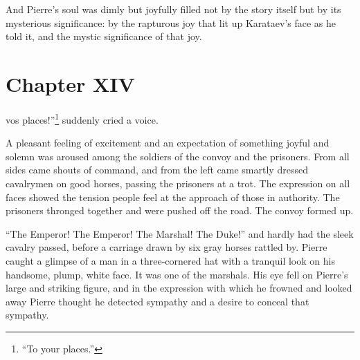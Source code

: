 And Pierre's soul was dimly but joyfully filled not by the story
itself but by its mysterious significance: by the rapturous joy
that lit up Karataev's face as he told it, and the mystic
significance of that joy.


\chapter*{Chapter XIV} \ifaudio {}
\fi

 vos places!''\footnote{``To your places.''} suddenly cried a
voice.

A pleasant feeling of excitement and an expectation of something
joyful and solemn was aroused among the soldiers of the convoy
and the prisoners. From all sides came shouts of command, and
from the left came smartly dressed cavalrymen on good horses,
passing the prisoners at a trot. The expression on all faces
showed the tension people feel at the approach of those in
authority. The prisoners thronged together and were pushed off
the road. The convoy formed up.

``The Emperor! The Emperor! The Marshal! The Duke!'' and hardly
had the sleek cavalry passed, before a carriage drawn by six gray
horses rattled by. Pierre caught a glimpse of a man in a
three-cornered hat with a tranquil look on his handsome, plump,
white face. It was one of the marshals. His eye fell on Pierre's
large and striking figure, and in the expression with which he
frowned and looked away Pierre thought he detected sympathy and a
desire to conceal that sympathy.

